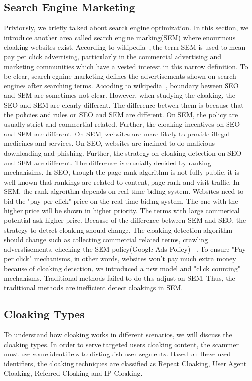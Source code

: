 \subsection{Search Engine Marketing}
Priviously, we briefly talked about search engine optimization. In this section, we introduce another area called search engine marking(SEM)
where enourmous cloaking websites exist. According to wikipedia~\cite{sem-wiki}, the term SEM is used to mean pay per click advertising,
particularly in the commercial advertising and marketing communities which have a vested interest in this narrow definition. To be clear,
search egnine marketing defines the advertisements shown on search engines after searching terms. Accoding to wikipedia~\cite{sem-wiki},
boundary beween SEO and SEM are sometimes not clear. However, when studying the cloaking, the SEO and SEM are clearly different. The difference
betwen them is because that the policies and rules on SEO and SEM are different. On SEM, the policy are usually strict and commertial-related. 
Further, the cloaking-incentives on SEO and SEM are different. On SEM, websites are more likely to provide illegal medicines and services. On SEO,
websites are inclined to do malicious downloading and phishing. 
Further, the strategy on cloaking detection on SEO and SEM are different. The difference is crucially decided by ranking mechanisims.
In SEO, though the page rank algorithm is not fully public, it is well known that rankings are related to content, page rank and visit traffic.
In SEM, the rank algroithm depends on real time biding system. Websites need to bid the "pay per click" price on the real time biding system. 
The one with the higher price will be shown in higher priority. The terms with large commerical potential ask higher price. Because of the 
difference between SEM and SEO, the strategy to detect cloaking should change. The cloaking detection algorithm should change such as collecting commercial related terms, 
crawling adverstisements, checking the SEM policy(Google Ads Policy)
~\cite{google-ad-policy}. To ensure "Pay per click" mechanisms, in other words,
websites won't pay much extra money because of cloaking detection, we introduced a new model and "click counting" mechanisms.
Traditional methods failed to do this adjust on SEM. Thus, the traditional methods are inefficient detect cloakings in SEM.
\subsection{Cloaking Types}
To understand how cloaking works in different scenarios, we will discuss the cloaking types.
In order to serve targeted users cloaking content, the scammer must use some identifiers to distinguish 
user segments. Based on these used identifiers, the cloaking techniques are classified as Repeat Cloaking, 
User Agent Cloaking, Referred Cloaking and IP Cloaking. 

